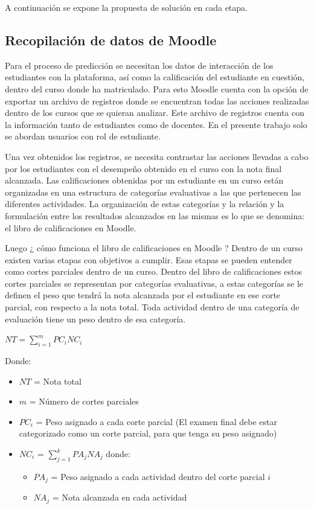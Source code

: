A continuación se expone la propuesta de solución en cada etapa.

\subsection{Recopilación de datos de Moodle}

Para el proceso de predicción se necesitan los datos de interacción de los estudiantes con la plataforma, así como la calificación del estudiante en cuestión, dentro del curso donde ha matriculado. Para esto Moodle cuenta con la opción de exportar un archivo de registros donde se encuentran todas las acciones realizadas dentro de los cursos que se quieran analizar. Este archivo de registros cuenta con la información tanto de estudiantes como de docentes. En el presente trabajo solo se abordan usuarios con rol de estudiante.  


Una vez obtenidos los registros, se necesita contrastar las acciones llevadas a cabo por los estudiantes con el desempeño obtenido en el curso con la nota final alcanzada. Las calificaciones obtenidas por un estudiante en un curso están organizadas en una estructura de categorías evaluativas a las que pertenecen las diferentes actividades. La organización de estas categorías y la relación y la formulación entre los resultados alcanzados en las mismas es lo que se denomina: el libro de calificaciones en Moodle.  


Luego ¿ cómo funciona el libro de calificaciones en Moodle ? Dentro de un curso existen varias etapas con objetivos a cumplir. Esas etapas se pueden entender como cortes parciales dentro de un curso. Dentro del libro de calificaciones estos cortes parciales se representan por categorías evaluativas, a estas categorías se le definen el peso que tendrá la nota alcanzada por el estudiante en ese corte parcial, con respecto a la nota total. Toda actividad dentro de una categoría de evaluación tiene un peso dentro de esa categoría.  


\begin{center}
    $NT = \displaystyle\sum_{i=1}^{m}PC_iNC_i$
\end{center}

Donde:  
\begin{itemize}
    \item $NT$ = Nota total
    \item $m$ = Número de cortes parciales
    \item $PC_i$ = Peso asignado a cada corte parcial (El examen final debe estar categorizado como un corte parcial, para que tenga su peso asignado)
    \item $NC_i$ = $\displaystyle\sum_{j=1}^{k}PA_jNA_j$ donde:
    \begin{itemize}
        \item $PA_j$ = Peso asignado a cada actividad dentro del corte parcial $i$
        \item $NA_j$ = Nota alcanzada en cada actividad
    \end{itemize}
\end{itemize}  

